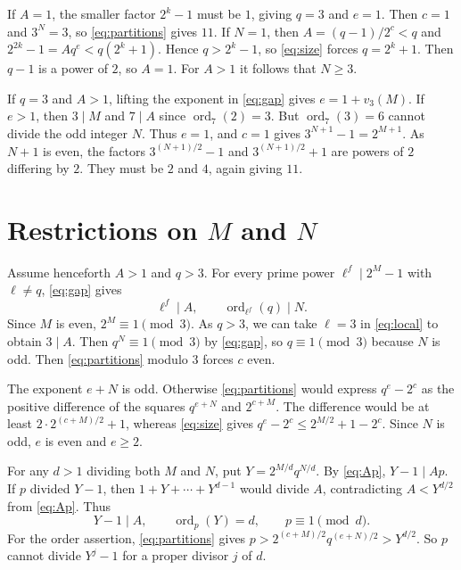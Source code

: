 \documentclass[11pt]{article}
\DeclareMathOperator{\ord}{ord}
\begin{document}
If $A=1$, the smaller factor $2^k-1$ must be $1$, giving $q=3$ and
$e=1$. Then $c=1$ and $3^N=3$, so \eqref{eq:partitions} gives $11$.
If $N=1$, then $A=(q-1)/2^c<q$ and
$2^{2k}-1=Aq^e<q(2^k+1)$. Hence $q>2^k-1$, so \eqref{eq:size}
forces $q=2^k+1$. Then $q-1$ is a power of $2$, so $A=1$.
For $A>1$ it follows that $N\ge3$.

If $q=3$ and $A>1$, lifting the exponent in \eqref{eq:gap} gives
$e=1+v_3(M)$. If $e>1$, then $3\mid M$ and $7\mid A$ since
$\ord_7(2)=3$. But $\ord_7(3)=6$ cannot divide the odd integer $N$.
Thus $e=1$, and $c=1$ gives $3^{N+1}-1=2^{M+1}$. As $N+1$ is even,
the factors $3^{(N+1)/2}-1$ and $3^{(N+1)/2}+1$ are powers of $2$
differing by $2$. They must be $2$ and $4$, again giving $11$.

\section{Restrictions on \texorpdfstring{$M$ and $N$}{M and N}}
\label{sec:restrictions}

Assume henceforth $A>1$ and $q>3$. For every prime power
$\ell^f\mid 2^M-1$ with $\ell\ne q$, \eqref{eq:gap} gives
\begin{equation}\label{eq:local}
\ell^f\mid A,\qquad \ord_{\ell^f}(q)\mid N.
\end{equation}
Since $M$ is even, $2^M\equiv1\pmod3$. As $q>3$, we can take
$\ell=3$ in \eqref{eq:local} to obtain $3\mid A$. Then
$q^N\equiv1\pmod3$ by \eqref{eq:gap}, so $q\equiv1\pmod3$
because $N$ is odd.
Then \eqref{eq:partitions} modulo $3$ forces $c$ even.

The exponent $e+N$ is odd. Otherwise \eqref{eq:partitions} would
express $q^e-2^c$ as the positive difference of the squares
$q^{e+N}$ and $2^{c+M}$. The difference would be at least
$2\cdot2^{(c+M)/2}+1$, whereas \eqref{eq:size} gives
$q^e-2^c\le2^{M/2}+1-2^c$. Since $N$ is odd, $e$ is even and $e\ge2$.

For any $d>1$ dividing both $M$ and $N$, put $Y=2^{M/d}q^{N/d}$.
By \eqref{eq:Ap}, $Y-1\mid Ap$. If $p$ divided $Y-1$, then
$1+Y+\cdots+Y^{d-1}$ would divide $A$, contradicting
$A<Y^{d/2}$ from \eqref{eq:Ap}. Thus
\begin{equation}\label{eq:common}
Y-1\mid A,\qquad \ord_p(Y)=d,\qquad p\equiv1\pmod d.
\end{equation}
For the order assertion, \eqref{eq:partitions} gives
$p>2^{(c+M)/2}q^{(e+N)/2}>Y^{d/2}$. So $p$ cannot divide $Y^j-1$ for
a proper divisor $j$ of $d$.
\end{document}
